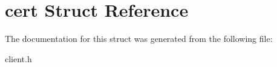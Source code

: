 \hypertarget{structcert}{\section{cert Struct Reference}
\label{structcert}
}


The documentation for this struct was generated from the following file\-:\begin{DoxyCompactItemize}
\item 
client.\-h\end{DoxyCompactItemize}

